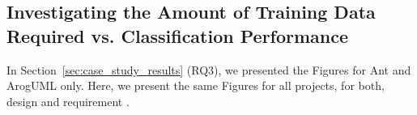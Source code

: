 
\clearpage

\subsection*{Investigating the Amount of Training Data Required vs. Classification Performance}

In Section~\ref{sec:case_study_results} (RQ3), we presented the Figures for Ant and ArogUML only. Here, we present the same Figures for all projects, for both, design and requirement \SATD.


